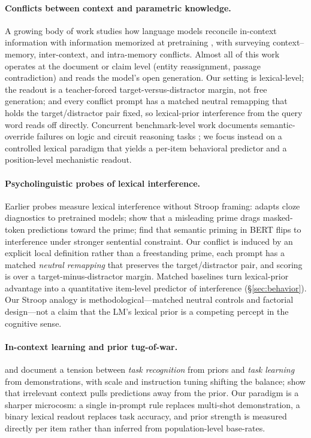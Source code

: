 \documentclass[11pt]{article}
\begin{document}
\paragraph{Conflicts between context and parametric knowledge.}
A growing body of work studies how language models reconcile in-context information with
information memorized at pretraining \citep{longpre2021entity, xie2024knowledge,
kortukov2024studying}, with \citet{xu2024knowledge} surveying context--memory, inter-context,
and intra-memory conflicts. Almost all of this work operates at the document or claim level
(entity reassignment, passage contradiction) and reads the model's open generation. Our
setting is lexical-level; the readout is a teacher-forced target-versus-distractor margin,
not free generation; and every conflict prompt has a matched neutral remapping that holds the
target/distractor pair fixed, so lexical-prior interference from the query word reads off
directly. Concurrent benchmark-level work documents semantic-override failures on logic and
circuit reasoning tasks \citep{thota2026semantic}; we focus instead on a controlled
lexical paradigm that yields a per-item behavioral predictor and a position-level mechanistic
readout.

\paragraph{Psycholinguistic probes of lexical interference.}
Earlier probes measure lexical interference without Stroop framing:
\citet{ettinger2020bert} adapts cloze diagnostics to pretrained models;
\citet{kassner2020negated} show that a misleading prime drags masked-token predictions toward
the prime; \citet{misra2020priming} find that semantic priming in BERT flips to interference
under stronger sentential constraint. Our conflict is induced by an explicit local definition
rather than a freestanding prime, each prompt has a matched \emph{neutral remapping} that
preserves the target/distractor pair, and scoring is over a target-minus-distractor margin.
Matched baselines turn lexical-prior advantage into a quantitative item-level predictor of
interference (\S\ref{sec:behavior}). Our Stroop analogy is methodological---matched neutral
controls and factorial design---not a claim that the LM's lexical prior is a competing
percept in the cognitive sense.

\paragraph{In-context learning and prior tug-of-war.}
\citet{wei2023larger} and \citet{pan2023incontext} document a tension between
\emph{task recognition} from priors and \emph{task learning} from demonstrations, with scale
and instruction tuning shifting the balance; \citet{shi2023distracted} show that irrelevant
context pulls predictions away from the prior. Our paradigm is a sharper microcosm: a single
in-prompt rule replaces multi-shot demonstration, a binary lexical readout replaces task
accuracy, and prior strength is measured directly per item rather than inferred from
population-level base-rates.
\end{document}
